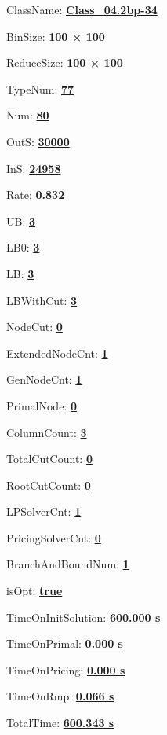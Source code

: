 \documentclass[11pt]{article}
\begin{document}
\pagestyle{empty}


ClassName: \underline{\textbf{Class_04.2bp-34}}
\par
BinSize: \underline{\textbf{100 × 100}}
\par
ReduceSize: \underline{\textbf{100 × 100}}
\par
TypeNum: \underline{\textbf{77}}
\par
Num: \underline{\textbf{80}}
\par
OutS: \underline{\textbf{30000}}
\par
InS: \underline{\textbf{24958}}
\par
Rate: \underline{\textbf{0.832}}
\par
UB: \underline{\textbf{3}}
\par
LB0: \underline{\textbf{3}}
\par
LB: \underline{\textbf{3}}
\par
LBWithCut: \underline{\textbf{3}}
\par
NodeCut: \underline{\textbf{0}}
\par
ExtendedNodeCnt: \underline{\textbf{1}}
\par
GenNodeCnt: \underline{\textbf{1}}
\par
PrimalNode: \underline{\textbf{0}}
\par
ColumnCount: \underline{\textbf{3}}
\par
TotalCutCount: \underline{\textbf{0}}
\par
RootCutCount: \underline{\textbf{0}}
\par
LPSolverCnt: \underline{\textbf{1}}
\par
PricingSolverCnt: \underline{\textbf{0}}
\par
BranchAndBoundNum: \underline{\textbf{1}}
\par
isOpt: \underline{\textbf{true}}
\par
TimeOnInitSolution: \underline{\textbf{600.000 s}}
\par
TimeOnPrimal: \underline{\textbf{0.000 s}}
\par
TimeOnPricing: \underline{\textbf{0.000 s}}
\par
TimeOnRmp: \underline{\textbf{0.066 s}}
\par
TotalTime: \underline{\textbf{600.343 s}}
\par
\newpage
\end{document}
